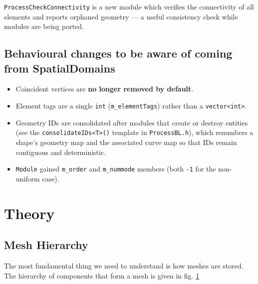 \noindent \texttt{ProcessCheckConnectivity} is a new module which
verifies the connectivity of all elements and reports orphaned
geometry --- a useful consistency check while modules are being
ported.

\subsection{Behavioural changes to be aware of coming from SpatialDomains}
\begin{itemize}
  \item Coincident vertices are \textbf{no longer removed by
    default}.
  \item Element tags are a single \texttt{int}
    (\texttt{m\_elementTags}) rather than a \texttt{vector<int>}.
  \item Geometry IDs are consolidated after modules that create or
    destroy entities (see the \texttt{consolidateIDs<T>()} template in
    \texttt{ProcessBL.h}), which renumbers a shape's geometry map and
    the associated curve map so that IDs remain contiguous and
    deterministic.
  \item \texttt{Module} gained \texttt{m\_order} and
    \texttt{m\_nummode} members (both \texttt{-1} for the non-uniform
    case).
\end{itemize}

\section{Theory}
\subsection{Mesh Hierarchy}
The most fundamental thing we need to understand is how meshes are stored. The hierarchy of components that form a mesh is given in fig. \ref{fig:NekMesh_hierarchy}\\

\begin{figure}[h!]
  \centering
  
  \caption{}
  \label{fig:NekMesh_hierarchy}
\end{figure}

